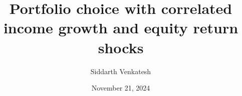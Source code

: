 \documentclass[12pt]{article}
\title{Portfolio choice with correlated income growth and equity return shocks}
\author{Siddarth Venkatesh}
\date{November 21, 2024}
\newcommand{\cd}{Draft 1}
\begin{document}


\onehalfspacing



\printbibliography

% 
% 
\end{document}
